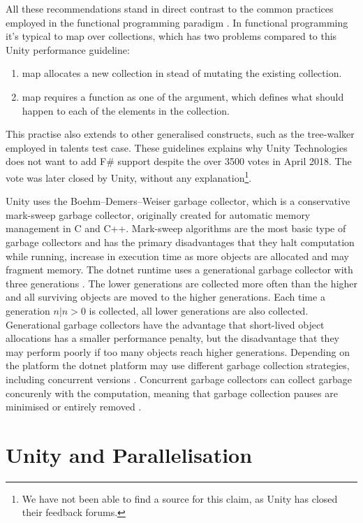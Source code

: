 All these recommendations stand in direct contrast to the common practices employed in the functional programming paradigm \needcite. In functional programming it's typical to map over collections, which has two problems compared to this Unity performance guideline:
\begin{enumerate}
    \item map allocates a new collection in stead of mutating the existing collection.
    \item map requires a function as one of the argument, which defines what should happen to each of the elements in the collection.
\end{enumerate}
This practise also extends to other generalised constructs, such as the tree-walker employed in talents test case. These guidelines explains why Unity Technologies does not want to add F\# support despite the over 3500 votes in April 2018\cite{unity:fsharp}. The vote was later closed by Unity, without any explanation\footnote{We have not been able to find a source for this claim, as Unity has closed their feedback forums.}.

Unity uses the Boehm–Demers–Weiser garbage collector\cite{boehm2007transparent}, which is a conservative mark-sweep garbage collector, originally created for automatic memory management in C and C++. Mark-sweep algorithms are the most basic type of garbage collectors and has the primary disadvantages that they halt computation while running, increase in execution time as more objects are allocated and may fragment memory\cite{spo:gc}. The dotnet runtime uses a generational garbage collector with three generations \cite{dotnet:gc}. The lower generations are collected more often than the higher and all surviving objects are moved to the higher generations. Each time a generation $n | n > 0$ is collected, all lower generations are also collected. Generational garbage collectors have the advantage that short-lived object allocations has a smaller performance penalty, but the disadvantage that they may perform poorly if too many objects reach higher generations. Depending on the platform the dotnet platform may use different garbage collection strategies, including concurrent versions \cite{dotnet:gc}. Concurrent garbage collectors can collect garbage concurenly with the computation, meaning that garbage collection pauses are minimised or entirely removed \cite{dotnet:gc}.


\section{Unity and Parallelisation}
